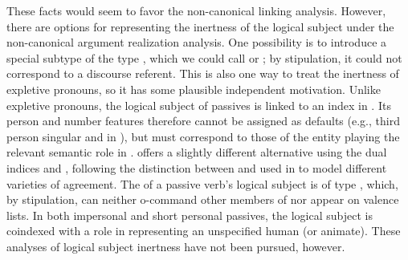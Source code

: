 \documentclass[output=paper
 	        ,biblatex
                ,babelshorthands
                ,newtxmath
                ,draftmode
                ,colorlinks, citecolor=brown
]{langscibook}
\begin{document}
These facts would seem to favor the non-canonical linking analysis.  However, there are options for
representing the inertness of the logical subject under the non-canonical argument realization
analysis.  One possibility is to introduce a special subtype of the type , which we
could call  or ; by stipulation, it could not correspond to a discourse
referent.  This is also one way to treat the inertness of expletive pronouns, so it has some
plausible independent motivation.  Unlike expletive pronouns, the logical subject of passives is
linked to an index in .  Its person and number features therefore cannot be assigned
as defaults (e.g., third person singular  and  in ), but must
correspond to those of the entity playing the relevant semantic role in .
\citet[251--253]{Davis2001} offers a slightly different alternative using the dual indices
 and , following the distinction between  and  used
in \citet[240--250]{Kathol1999b} to model different varieties of agreement.  The  of a
passive verb's logical subject is of type , which, by stipulation, can neither o-command
other members of \argst nor appear on valence lists.
In both impersonal and short personal passives, the logical subject is coindexed with a role in  representing an unspecified human (or animate).
These analyses of logical subject inertness have not been pursued, however.

\end{document}
